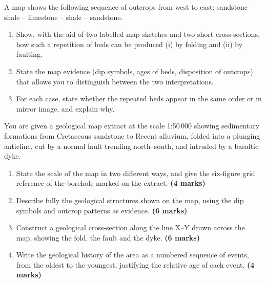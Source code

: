 \documentclass[11pt]{article}
\newcounter{popsec}
\newcounter{popsub}
\newcommand{\courssub}[1]{%
  \stepcounter{popsub}%
  \par\vspace{9pt}\noindent{\popxbold\fontsize{11.5}{13}\selectfont\color{popink}{\color{poporange}\thepopsec.\thepopsub}\hspace{6pt}#1}\par\nopagebreak\vspace{4pt}
}
\begin{document}
\begin{exercice}
A map shows the following sequence of outcrops from west to east: sandstone -- shale -- limestone -- shale -- sandstone.
\begin{enumerate}
\item Show, with the aid of two labelled map sketches and two short cross-sections, how such a repetition of beds can be produced (i) by folding and (ii) by faulting.
\item State the map evidence (dip symbols, ages of beds, disposition of outcrops) that allows you to distinguish between the two interpretations.
\item For each case, state whether the repeated beds appear in the same order or in mirror image, and explain why.
\end{enumerate}
\end{exercice}

\courssub{I prepare for the GCE}

\begin{exercice}
You are given a geological map extract at the scale 1:50\,000 showing sedimentary formations from Cretaceous sandstone to Recent alluvium, folded into a plunging anticline, cut by a normal fault trending north--south, and intruded by a basaltic dyke.
\begin{enumerate}
\item State the scale of the map in two different ways, and give the six-figure grid reference of the borehole marked on the extract. \textbf{(4 marks)}
\item Describe fully the geological structures shown on the map, using the dip symbols and outcrop patterns as evidence. \textbf{(6 marks)}
\item Construct a geological cross-section along the line X--Y drawn across the map, showing the fold, the fault and the dyke. \textbf{(6 marks)}
\item Write the geological history of the area as a numbered sequence of events, from the oldest to the youngest, justifying the relative age of each event. \textbf{(4 marks)}
\end{enumerate}
\end{exercice}
\end{document}
